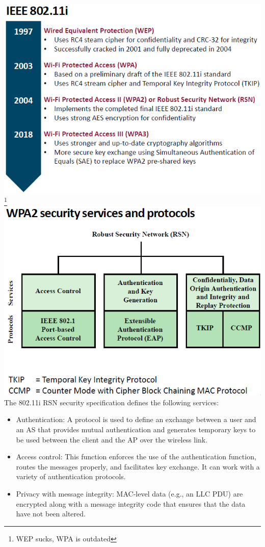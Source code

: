 \documentclass[12pt]{article}
\begin{document}
 \includegraphics[width=\linewidth]{./slides/L7P1WIFIENCR.PNG}\footnote{WEP sucks, WPA is outdated}\\
 \includegraphics[width=\linewidth]{./slides/L7P1WPA2.PNG}\\
 The 802.11i RSN security specification defines the following services:
 \begin{itemize}
 	\item Authentication: A protocol is used to define an exchange between a user and an AS	that provides mutual authentication and generates temporary keys to be used between the client and the AP over the wireless link.
 	\item Access control: This function enforces the use of the authentication function, routes the messages properly, and facilitates key exchange. It can work with a variety of authentication protocols.
 	\item Privacy with message integrity: MAC-level data (e.g., an LLC PDU) are encrypted along with a message integrity code that ensures that the data have not been altered.
 \end{itemize}
\end{document}

